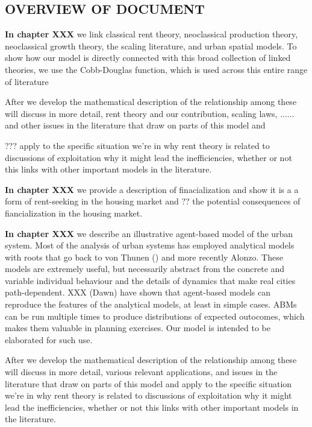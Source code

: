 \subsection{OVERVIEW OF DOCUMENT}
\color{blue}

\textbf{In chapter XXX}  we link classical rent theory, neoclassical production theory, neoclassical growth theory, the scaling literature, and urban spatial models.
To show how our model is directly connected with this broad collection of linked theories, we use the Cobb-Douglas function, which is used across this entire range of literature 

After we develop the mathematical description of the relationship among these will discuss  in more detail, rent theory and our contribution, scaling laws, ......  and other issues in the literature that draw on parts of this model and 

???  apply to the specific situation we're in why rent theory is related to discussions of exploitation why it might lead the inefficiencies, whether or not this links with other important models in the literature.

\textbf{In chapter XXX} we  provide a description of finacialization and show it is a a form of rent-seeking in the housing market and ?? the potential consequences of fiancialization in the housing market. 



\textbf{In chapter XXX} we  describe an illustrative agent-based model of the urban system. Most of the analysis of urban systems has employed analytical models with roots that go back to von Thunen () and more recently Alonzo. These models are extremely useful, but necessarily abstract from the concrete  and variable individual behaviour and  the details  of dynamics that make real cities path-dependent. XXX (Dawn) have shown that agent-based models can reproduce the features of the analytical models, at least in simple cases. ABMs can be run multiple times to produce distributions of expected outocomes, which makes them valuable in planning exercises.  Our model is intended to be elaborated  for such use. 

After we develop the mathematical description of the relationship among these will discuss in more detail, various relevant applications, and issues in the literature that draw on parts of this model and apply to the specific situation we're in why rent theory is related to discussions of exploitation why it might lead the inefficiencies, whether or not this links with other important models in the literature.


